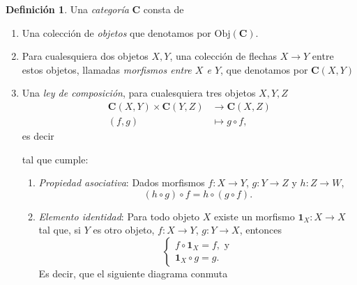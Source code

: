 \documentclass[12pt,a4paper]{book}
\theoremstyle{definition} \newtheorem{defn}[thm]{Definición}
\theoremstyle{definition} \newtheorem{ejemplo}[thm]{Ejemplo}
\theoremstyle{definition} \newtheorem{ejercicio}[thm]{Ejercicio}
\theoremstyle{remark} \newtheorem*{obs}{Observación}
\def\id{\mathbf{1}}
\def\obj{\mathrm{Obj}}
\def\cat{\mathbf{C}}
\begin{document}
\begin{defn}
  Una \emph{categoría} $\cat$ consta de
  \begin{enumerate}
    \item Una colección de \emph{objetos} que denotamos por $\obj(\cat)$.
    \item Para cualesquiera dos objetos $X,Y$, una colección de flechas $X\rightarrow Y$ entre estos objetos, llamadas \emph{morfismos entre $X$ e $Y$}, que denotamos por $\cat(X,Y)$
    \item Una \emph{ley de composición}, para cualesquiera tres objetos $X,Y,Z$
      \begin{align*}
	\cat(X,Y)\times \cat(Y,Z)&\longrightarrow \cat(X,Z)\\ 
	  (f,g) &\longmapsto g\circ f, 
	\end{align*}
es decir
\begin{center}
 \end{center}
 tal que cumple:
 \begin{enumerate}
   \item \textit{Propiedad asociativa}: Dados morfismos $f:X\rightarrow Y$, $g:Y\rightarrow Z$ y $h:Z\rightarrow W$,
     \begin{equation*}
       (h\circ g)\circ f = h\circ(g\circ f).
     \end{equation*}
   \item \textit{Elemento identidad}: Para todo objeto $X$ existe un morfismo $\id_X:X\rightarrow X$ tal que, si $Y$ es otro objeto, $f:X\rightarrow Y$, $g:Y\rightarrow X$, entonces
     \begin{equation*}
       \begin{cases}
	 f\circ \id_X=f, \text{ y} \\
	 \id_X\circ g=g.
       \end{cases}
     \end{equation*}
     Es decir, que el siguiente diagrama conmuta
     \begin{center}
       \end{center}
 \end{enumerate}
  \end{enumerate}
\end{defn}
\end{document}
